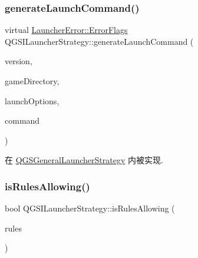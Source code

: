 \subsubsection{\texorpdfstring{generate\+Launch\+Command()}{generateLaunchCommand()}}
{\footnotesize\ttfamily virtual \mbox{\hyperlink{namespace_launcher_error_ac3a8c0329368b890069c60ac80628085}{Launcher\+Error\+::\+Error\+Flags}} Q\+G\+S\+I\+Launcher\+Strategy\+::generate\+Launch\+Command (\begin{DoxyParamCaption}\item[{const \mbox{\hyperlink{class_q_g_s_game_version}{Q\+G\+S\+Game\+Version}} \&}]{version,  }\item[{\mbox{\hyperlink{class_q_g_s_game_directory}{Q\+G\+S\+Game\+Directory}} \&}]{game\+Directory,  }\item[{const \mbox{\hyperlink{class_q_g_s_launch_options}{Q\+G\+S\+Launch\+Options}} $\ast$}]{launch\+Options,  }\item[{Q\+String \&}]{command }\end{DoxyParamCaption})\hspace{0.3cm}{\ttfamily [pure virtual]}}



在 \mbox{\hyperlink{class_q_g_s_general_launcher_strategy_a224aef3dbad0412c02f2952644d00260}{Q\+G\+S\+General\+Launcher\+Strategy}} 内被实现.

\mbox{\label{class_q_g_s_i_launcher_strategy_aa443633178590a1831e9867e8345488e}} 
\subsubsection{\texorpdfstring{is\+Rules\+Allowing()}{isRulesAllowing()}}
{\footnotesize\ttfamily bool Q\+G\+S\+I\+Launcher\+Strategy\+::is\+Rules\+Allowing (\begin{DoxyParamCaption}\item[{const \mbox{\hyperlink{class_q_g_s_rules}{Q\+G\+S\+Rules}} \&}]{rules }\end{DoxyParamCaption})\hspace{0.3cm}{\ttfamily [protected]}}

\mbox{\label{class_q_g_s_i_launcher_strategy_ae47233d64af17d2435f5c61640db8779}} 

